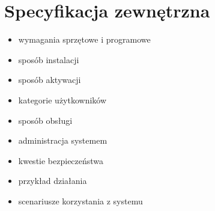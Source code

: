 \chapter{Specyfikacja zewnętrzna}
 {
  \begin{itemize}
      \item wymagania sprzętowe i programowe
      \item sposób instalacji
      \item sposób aktywacji
      \item kategorie użytkowników
      \item sposób obsługi 
      \item administracja systemem
      \item kwestie bezpieczeństwa
      \item przykład działania
      \item scenariusze korzystania z systemu
  \end{itemize}
 }